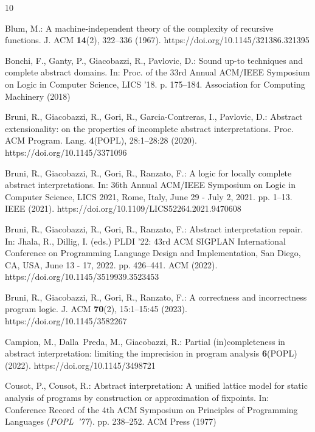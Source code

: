 \documentclass[runningheads]{llncs}
\begin{document}

%
\begin{thebibliography}{10}
\providecommand{\url}[1]{\texttt{#1}}
\providecommand{\urlprefix}{URL }
\providecommand{\doi}[1]{https://doi.org/#1}

Blum, M.: A machine-independent theory of the complexity of recursive
  functions. J. {ACM}  \textbf{14}(2),  322--336 (1967).
  \doi{10.1145/321386.321395}

Bonchi, F., Ganty, P., Giacobazzi, R., Pavlovic, D.: Sound up-to techniques and
  complete abstract domains. In: Proc. of the 33rd Annual ACM/IEEE Symposium on
  Logic in Computer Science, LICS '18. p. 175–184. Association for Computing
  Machinery (2018)

Bruni, R., Giacobazzi, R., Gori, R., Garcia{-}Contreras, I., Pavlovic, D.:
  Abstract extensionality: on the properties of incomplete abstract
  interpretations. Proc. {ACM} Program. Lang.  \textbf{4}({POPL}),  28:1--28:28
  (2020). \doi{10.1145/3371096}

Bruni, R., Giacobazzi, R., Gori, R., Ranzato, F.: A logic for locally complete
  abstract interpretations. In: 36th Annual {ACM/IEEE} Symposium on Logic in
  Computer Science, {LICS} 2021, Rome, Italy, June 29 - July 2, 2021. pp.
  1--13. {IEEE} (2021). \doi{10.1109/LICS52264.2021.9470608}

Bruni, R., Giacobazzi, R., Gori, R., Ranzato, F.: Abstract interpretation
  repair. In: Jhala, R., Dillig, I. (eds.) {PLDI} '22: 43rd {ACM} {SIGPLAN}
  International Conference on Programming Language Design and Implementation,
  San Diego, CA, USA, June 13 - 17, 2022. pp. 426--441. {ACM} (2022).
  \doi{10.1145/3519939.3523453}

Bruni, R., Giacobazzi, R., Gori, R., Ranzato, F.: A correctness and
  incorrectness program logic. J. {ACM}  \textbf{70}(2),  15:1--15:45 (2023).
  \doi{10.1145/3582267}

Campion, M., Dalla~Preda, M., Giacobazzi, R.: Partial (in)completeness in
  abstract interpretation: limiting the imprecision in program analysis
  \textbf{6}(POPL) (2022). \doi{10.1145/3498721}

Cousot, P., Cousot, R.: Abstract interpretation: A unified lattice model for
  static analysis of programs by construction or approximation of fixpoints.
  In: Conference Record of the 4th ACM Symposium on Principles of Programming
  Languages {\rm ({\em POPL~'77\/})}. pp. 238--252. ACM Press (1977)


\end{thebibliography}
\end{document}
